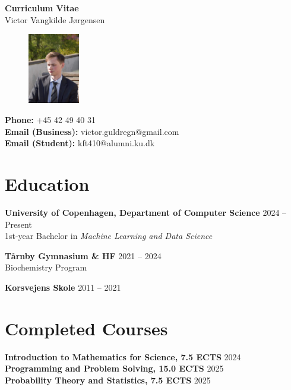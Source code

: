 \documentclass[a4paper,10pt]{article}
\makeatletter
\newcommand{\name}{Victor Vangkilde J\o rgensen}
\newcommand{\phone}{+45 42 49 40 31}
\newcommand{\emailBusiness}{victor.guldregn@gmail.com}
\newcommand{\emailStudent}{kft410@alumni.ku.dk}
\makeatother
\begin{document}
\begin{center}
    {\LARGE \textbf{Curriculum Vitae}}\\[1ex]
    {\large \name}
\end{center}

\begin{figure}[h!]
    \centering
    \includegraphics[width=0.2\textwidth, trim={3cm 2cm 1.5cm 4cm},clip]{profilbillede.jpg}
\end{figure}

\noindent
\textbf{Phone:} \phone \\
\textbf{Email (Business):} \emailBusiness \\
\textbf{Email (Student):} \emailStudent \\

\section*{Education}
\textbf{University of Copenhagen, Department of Computer Science} \hfill 2024 -- Present \\
1st-year Bachelor in \textit{Machine Learning and Data Science}

\textbf{T\aa rnby Gymnasium \& HF} \hfill 2021 -- 2024 \\
Biochemistry Program

\textbf{Korsvejens Skole} \hfill 2011 -- 2021 \\

\section*{Completed Courses}
\textbf{Introduction to Mathematics for Science, 7.5 ECTS} \hfill 2024 \\
\textbf{Programming and Problem Solving, 15.0 ECTS} \hfill 2025 \\
\textbf{Probability Theory and Statistics, 7.5 ECTS} \hfill 2025 \\
\end{document}

